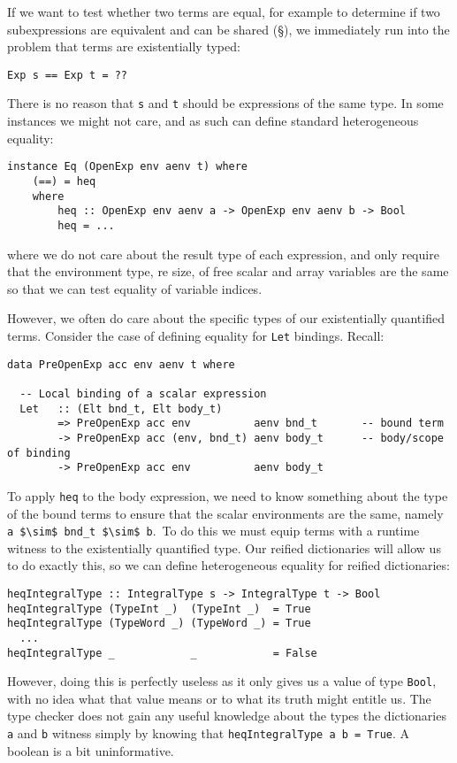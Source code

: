 If we want to test whether two terms are equal, for example to determine if two
subexpressions are equivalent and can be shared (\S \derp), we
immediately run into the problem that terms are existentially typed:
%
\begin{lstlisting}[style=haskell]
Exp s == Exp t = ??
\end{lstlisting}
%
There is no reason that \texttt{s} and \texttt{t} should be expressions of the
same type. In some instances we might not care, and as such can define standard
heterogeneous equality:
%
\begin{lstlisting}[style=haskell]
instance Eq (OpenExp env aenv t) where
    (==) = heq
    where
        heq :: OpenExp env aenv a -> OpenExp env aenv b -> Bool
        heq = ...
\end{lstlisting}
%
where we do not care about the result type of each expression, and only require
that the environment type, re size, of free scalar and array variables are the
same so that we can test equality of variable indices.

However, we often do care about the specific types of our existentially
quantified terms. Consider the case of defining equality for \texttt{Let}
bindings. Recall:
%
\begin{lstlisting}[style=haskell]
data PreOpenExp acc env aenv t where

  -- Local binding of a scalar expression
  Let   :: (Elt bnd_t, Elt body_t)
        => PreOpenExp acc env          aenv bnd_t       -- bound term
        -> PreOpenExp acc (env, bnd_t) aenv body_t      -- body/scope of binding
        -> PreOpenExp acc env          aenv body_t
\end{lstlisting}
%
To apply \texttt{heq} to the body expression, we need to know something about
the type of the bound terms to ensure that the scalar environments are the same,
namely \lstinline[mathescape=true]{a $\sim$ bnd_t $\sim$ b}.\footnotemark\ To do
this we must equip terms with a runtime witness to the existentially quantified
type. Our reified dictionaries will allow us to do exactly this, so we can
define heterogeneous equality for reified dictionaries:
%
%
\begin{lstlisting}[style=haskell]
heqIntegralType :: IntegralType s -> IntegralType t -> Bool
heqIntegralType (TypeInt _)  (TypeInt _)  = True
heqIntegralType (TypeWord _) (TypeWord _) = True
  ...
heqIntegralType _            _            = False
\end{lstlisting}
%
However, doing this is perfectly useless as it only gives us a value of type
\texttt{Bool}, with no idea what that value means or to what its truth might
entitle us. The type checker does not gain any useful knowledge about the types
the dictionaries \texttt{a} and \texttt{b} witness simply by knowing that
\lstinline{heqIntegralType a b = True}. A boolean is a bit uninformative.

